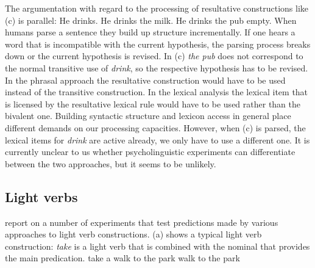\begin{exe}
\begin{xlist}[iv.]
\begin{exe}
\begin{xlist}[iv.]
The argumentation with regard to the processing of resultative constructions like (c) is parallel:
\eal
\ex He drinks.
\ex He drinks the milk.
\ex He drinks the pub empty.
\zl
When humans parse a sentence they build up structure incrementally. If one hears a word that is
incompatible with the current hypothesis, the parsing process breaks down or the current hypothesis
is revised. In (c) \emph{the pub} does not correspond to the normal transitive use of
\emph{drink}, so the respective hypothesis has to be revised. In the phrasal approach the resultative
construction would have to be used instead of the transitive construction. In the lexical analysis
the lexical item that is licensed by the resultative lexical rule would have to be used rather than
the bivalent one. Building syntactic structure and lexicon access in general place different
demands on our processing capacities. However, when (c) is parsed, the lexical items for
\emph{drink} are active already, we only have to use a different one. It is currently unclear to us
whether psycholinguistic experiments can differentiate between the two approaches, but it seems to
be unlikely.


\subsection{Light verbs}
\label{sec-psycho-lv}

\largerpage[2]
\citet*{WJKP2014a} report on a number of experiments that test predictions made by
various approaches to light verb constructions. (a) shows a typical light verb construction:
\emph{take} is a light verb that is combined with the nominal that provides the main
predication. 
\eal
\ex take a walk to the park
\ex walk to the park
\zl


\end{xlist}
\end{exe}
\end{xlist}
\end{exe}
